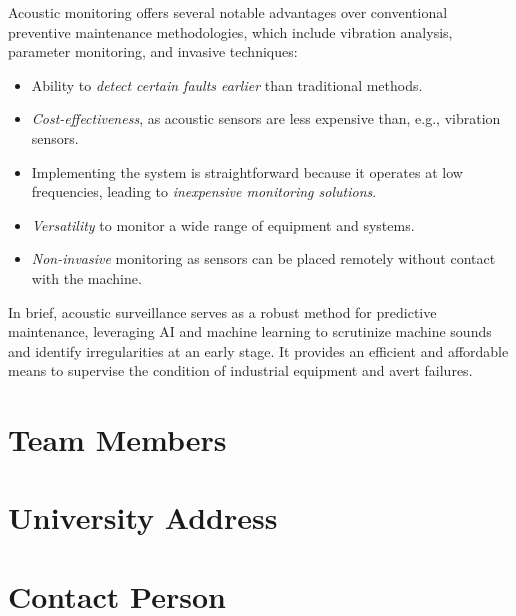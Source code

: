 \documentclass[12pt]{article}
\begin{document}
Acoustic monitoring offers several notable advantages over conventional preventive maintenance methodologies, which include vibration analysis, parameter monitoring, and invasive techniques:
\begin{itemize}
    \item Ability to \textit{detect certain faults earlier} than traditional methods.
    \item \textit{Cost-effectiveness}, as acoustic sensors are less expensive than, e.g., vibration sensors.
    \item Implementing the system is straightforward because it operates at low frequencies, leading to \textit{inexpensive monitoring solutions}.
    \item \textit{Versatility} to monitor a wide range of equipment and systems.
    \item \textit{Non-invasive} monitoring as sensors can be placed remotely without contact with the machine.
\end{itemize}

In brief, acoustic surveillance serves as a robust method for predictive maintenance, leveraging AI and machine learning to scrutinize machine sounds and identify irregularities at an early stage. It provides an efficient and affordable means to supervise the condition of industrial equipment and avert failures.


\section{Team Members}

\section{University Address}

\section{Contact Person}



\end{document}
